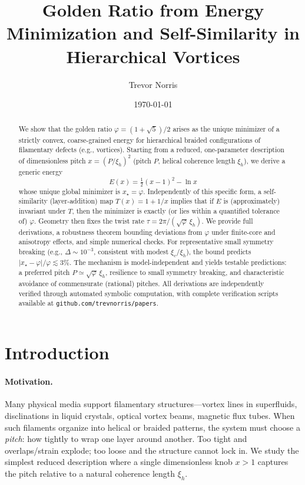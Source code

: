 \documentclass[11pt]{article}
\title{Golden Ratio from Energy Minimization and Self-Similarity in Hierarchical Vortices}
\author{Trevor Norris}
\date{\small \today}
\theoremstyle{remark}
\theoremstyle{definition}
\newcommand{\ph}{\varphi}
\begin{document}
\maketitle

\begin{abstract}
We show that the golden ratio $\ph=(1+\sqrt5)/2$ arises as the unique minimizer of a strictly convex, coarse-grained energy for hierarchical braided configurations of filamentary defects (e.g., vortices). Starting from a reduced, one-parameter description of dimensionless pitch $x=(P/\xi_h)^2$ (pitch $P$, helical coherence length $\xi_h$), we derive a generic energy
\[
E(x)=\tfrac12(x-1)^2-\ln x
\]
whose unique global minimizer is $x_\star=\ph$. Independently of this specific form, a self-similarity (layer-addition) map $T(x)=1+1/x$ implies that if $E$ is (approximately) invariant under $T$, then the minimizer is exactly (or lies within a quantified tolerance of) $\ph$. Geometry then fixes the twist rate $\tau=2\pi/(\sqrt{\ph}\,\xi_h)$. We provide full derivations, a robustness theorem bounding deviations from $\ph$ under finite-core and anisotropy effects, and simple numerical checks. For representative small symmetry breaking (e.g., $\Delta\sim10^{-3}$, consistent with modest $\xi_c/\xi_h$), the bound predicts $|x_\star-\ph|/\ph\lesssim 3\%$. The mechanism is model-independent and yields testable predictions: a preferred pitch $P\simeq\sqrt{\ph}\,\xi_h$, resilience to small symmetry breaking, and characteristic avoidance of commensurate (rational) pitches. All derivations are independently verified through automated symbolic computation, with complete verification scripts available at \texttt{github.com/trevnorris/papers}.
\end{abstract}

\section{Introduction}
\paragraph{Motivation.} Many physical media support filamentary structures---vortex lines in superfluids, disclinations in liquid crystals, optical vortex beams, magnetic flux tubes. When such filaments organize into helical or braided patterns, the system must choose a \emph{pitch}: how tightly to wrap one layer around another. Too tight and overlaps/strain explode; too loose and the structure cannot lock in. We study the simplest reduced description where a single dimensionless knob $x>1$ captures the pitch relative to a natural coherence length $\xi_h$.
\end{document}

